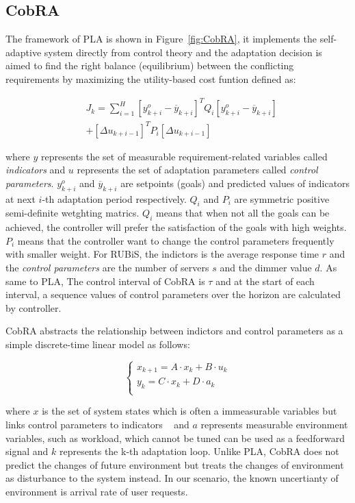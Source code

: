 \documentclass[sigconf]{acmart}
\begin{document}
	\subsection{CobRA}
	The framework of PLA is shown in Figure~\ref{fig:CobRA}, it implements the self-adaptive system directly from control theory and the adaptation decision is aimed to find the right balance (equilibrium) between the conflicting requirements by maximizing the utility-based cost funtion defined as:
	
	\begin{equation}
	\begin{aligned}
	&J_{k}=\sum_{i=1}^H [y_{k+i}^o-\overline{y}_{k+i}]^TQ_{i}[y_{k+i}^o -\overline{y}_{k+i}] \\
	&+[\Delta u_{k+i-1}]^T P_{i}[\Delta u_{k+i-1}]
	\end{aligned}
	\end{equation}
	
	where $y$ represents the set of measurable requirement-related variables called \textit{indicators} and $u$ represents the set of adaptation parameters called \textit{control parameters}. $y_{k+i}^o$ and $\overline{y}_{k+i}$ are setpoints (goals) and predicted values of indicators at next $i$-th adaptation period respectively. $Q_{i}$ and $P_{i}$ are symmetric positive semi-definite wetghting matrics. $Q_i$ means that when not all the goals can be achieved, the controller will prefer the satisfaction of the goals with high weights. $P_i$ means that the controller want to change the control parameters frequently with smaller weight. For RUBiS, the indictors is the average response time $r$ and the \textit{control parameters} are the number of servers $s$ and the dimmer value $d$. As same to PLA, The control interval of CobRA is $\tau$ and at the start of each interval, a sequence values of control parameters over the horizon are calculated by controller.
	
	CobRA abstracts the relationship between indictors and control parameters as a simple discrete-time linear model as follows:
	
	\begin{equation}
	\left\{
	\begin{array}{rcl}
	x_{k+1}=A\cdot x_k+B\cdot u_k\\
	y_k=C\cdot x_k+D\cdot a_k\\
	\end{array} \right.
	\label{eqn5}
	\end{equation}
	
	\noindent where $x$ is the set of system states which is often a immeasurable variables but links control parameters to indicators ~\cite{maggio2017automated} and $a$ represents measurable environment variables, such as workload, which cannot be tuned can be used as a feedforward signal and $k$ represents the k-th adaptation loop. Unlike PLA, CobRA does not predict the changes of future environment but treats the changes of environment as disturbance to the system instead. In our scenario, the known uncertianty of environment is arrival rate of user requests.
	
\end{document}
